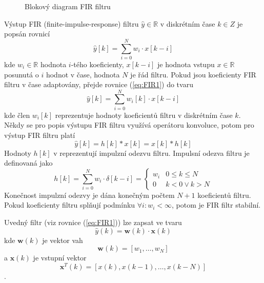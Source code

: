 \begin{figure}[h!]
    \caption{Blokový diagram FIR filtru}

\end{figure}
Výstup FIR (finite-impulse-response) filtru $\hat y \in \mathbb{R}$  v diskrétním čase  $k \in Z$  je popsán rovnicí
\begin{equation}\label{eq:FIR1}
    \hat{y}[k]=\sum_{i=0}^{N}w_i \cdot x[k-i] 
\end{equation}
kde $w_i \in \mathbb{R} $ hodnota $i$-tého koeficienty, $x[k-i] $ je hodnota vstupu $x \in \mathbb{R} $ posunutá o $i$ hodnot v čase, hodnota $N$ je řád filtru. Pokud jsou koeficienty FIR filtru v čase adaptovány, přejde rovnice (\ref{eq:FIR1}) do tvaru
\begin{equation}
    \hat{y}[k]=\sum_{i=0}^{N}w_i[k] \cdot x[k-i] 
\end{equation}
kde člen $w_i[k]$ reprezentuje hodnoty koeficientů filtru v diskrétním čase $k$.
Někdy se pro popis výstupu FIR filtru využívá operátoru konvoluce, potom pro výstup FIR filtru platí
\begin{equation}
    \hat{y}[k]= h[k] * x[k]=x[k] * h[k]
\end{equation}
 Hodnoty $h[k]$ v reprezentují impulzní odezvu filtru. Impulsní odezva filtru je definovaná jako
 \begin{equation}
     h[k]=\sum_{i=0}^N w_i \cdot \delta[k-i]=
     \begin{cases}
     w_i & 0 \leq k \leq N \\
     0 & k < 0 \lor k > N 
     \end{cases}
 \end{equation}
 Konečnost impulzní odezvy je dána konečným počtem $N+1$ koeficientů filtru. Pokud koeficienty filtru splňují podmínku $\forall i: w_i < \infty$, potom je FIR filtr stabilní. 
 \par
 Uvedný filtr (viz rovnice (\ref{eq:FIR1})) lze zapsat ve tvaru
 \begin{equation}
     \hat{y}(k)= \textbf{w}(k)\cdot\textbf{x}(k)
 \end{equation}
kde $\textbf{w}(k)$ je vektor vah
\begin{equation}
    \textbf{w}(k)=[w_1,\dots, w_N]
\end{equation}
a $\textbf{x}(k)$ je vstupní vektor
\begin{equation}
    \textbf{x}^T(k)=[x(k),x(k-1),\dots,x(k-N)]
\end{equation}.


